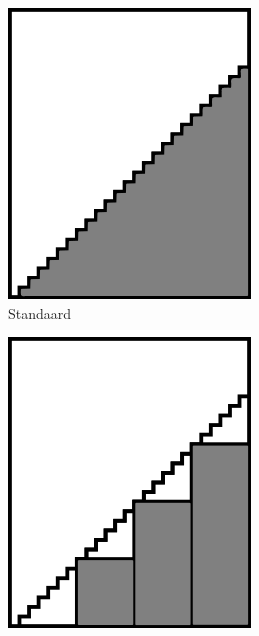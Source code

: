 \begin{figure}[]
\centering
\begin{subfigure}{0.22\textwidth}
  \centering
  \includegraphics[width=0.9\linewidth]{images/orthogonality_compression1.png}
  \caption{Standaard}
  \label{fig:orthogonality_compression_visual_standard}
\end{subfigure}%
\begin{subfigure}{.22\textwidth}
  \centering
  \includegraphics[width=0.9\linewidth]{images/orthogonality_compression2.png}

\end{subfigure}
\end{figure}
